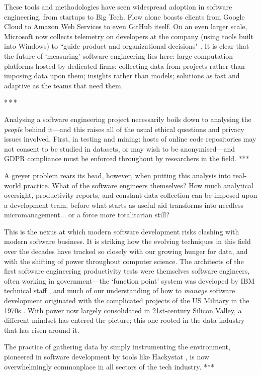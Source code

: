 \documentclass[12pt]{article}
\newcommand{\parbreak}{\bigskip\par\centerline{*\,*\,*}\medskip\par}
\begin{document}
	These tools and methodologies have seen widespread adoption in software engineering, from startups to Big Tech. Flow alone boasts clients from Google Cloud to Amazon Web Services to even GitHub itself. On an even larger scale, Microsoft now collects telemetry on developers at the company (using tools built into Windows) to ``guide product and organizational decisions" \cite{windows}. It is clear that the future of `measuring' software engineering lies here: large computation platforms hosted by dedicated firms; collecting data from projects rather than imposing data upon them; insights rather than models; solutions as fast and adaptive as the teams that need them.
	
	\parbreak
	
	Analysing a software engineering project necessarily boils down to analysing the \textit{people} behind it---and this raises all of the usual ethical questions and privacy issues involved. First, in testing and mining: hosts of online code repositories may not consent to be studied in datasets, or may wish to be anonymised---and GDPR compliance must be enforced throughout by research\-ers in the field. ***
	
	A greyer problem rears its head, however, when putting this analysis into real-world practice. What of the software engineers themselves? How much analytical oversight, productivity reports, and constant data collection can be imposed upon a development team, before what starts as useful aid transforms into needless micromanagement... or a force more totalitarian still?
	
	This is the nexus at which modern software development risks clashing with modern software business. It is striking how the evolving techniques in this field over the decades have tracked so closely with our growing hunger for data, and with the shifting of power throughout computer science. The architects of the first software engineering productivity tests were themselves software engineers, often working in government---the `function point' system was developed by IBM technical staff \cite{stutzke}, and much of our understanding of how to \textit{manage} software development originated with the complicated projects of the US Military in the 1970s \cite{rand}. With power now largely consolidated in 21st-century Silicon Valley, a different mindset has entered the picture; this one rooted in the data industry that has risen around it.
	
	The practice of gathering data by simply instrumenting the environment, pioneered in software development by tools like Hackystat \cite{telemetry}, is now overwhelmingly commonplace in all sectors of the tech industry. ***
	
\end{document}
